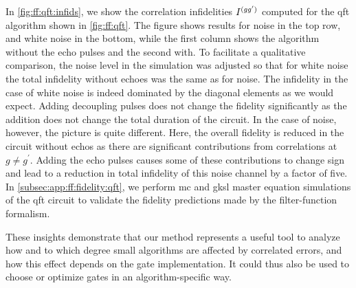 In \cref{fig:ff:qft:infids}, we show the correlation infidelities $I^{(gg^{\prime})}$ computed for the \gls{qft} algorithm shown in \cref{fig:ff:qft}.
The figure shows results for \oneoverf noise in the top row, and white noise in the bottom, while the first column shows the algorithm without the echo pulses and the second with.
To facilitate a qualitative comparison, the noise level in the simulation was adjusted so that for white noise the total infidelity without echoes was the same as for \oneoverf noise.
The infidelity in the case of white noise is indeed dominated by the diagonal elements as we would expect.
Adding decoupling pulses does not change the fidelity significantly as the addition does not change the total duration of the circuit.
In the case of \oneoverf noise, however, the picture is quite different.
Here, the overall fidelity is reduced in the circuit without echos as there are significant contributions from correlations at $g\neq g^{\prime}$.
Adding the echo pulses causes some of these contributions to change sign and lead to a reduction in total infidelity of this noise channel by a factor of five.
In \cref{subsec:app:ff:fidelity:qft}, we perform \gls{mc} and \gls{gksl} master equation simulations of the \gls{qft} circuit to validate the fidelity predictions made by the filter-function formalism.

These insights demonstrate that our method represents a useful tool to analyze how and to which degree small algorithms are affected by correlated errors, and how this effect depends on the gate implementation.
It could thus also be used to choose or optimize gates in an algorithm-specific way.
